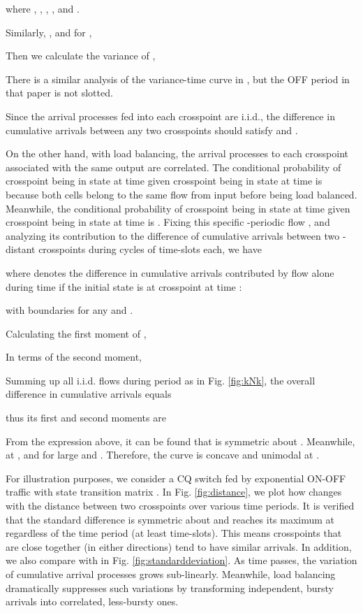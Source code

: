 \documentclass[journal,final,doublecolumn,10pt,twoside]{IEEEtranTCOM} \normalsize
\begin{document}
where , , , , and .

Similarly, , and for ,



Then we calculate the variance of ,
 
There is a similar analysis of the variance-time curve in \cite{variancetime}, but the OFF period in that paper is not slotted.

Since the arrival processes fed into each crosspoint are i.i.d., the difference in cumulative arrivals between any two crosspoints  should satisfy  and .

On the other hand, with load balancing, the arrival processes to each crosspoint associated with the same output are correlated. The conditional probability of crosspoint  being in state  at time  given crosspoint  being in state  at time  is  because both cells belong to the same flow from input  before being load balanced. Meanwhile, the conditional probability of crosspoint  being in state  at time  given crosspoint  being in state  at time  is . Fixing this specific -periodic flow , and analyzing its contribution to the difference of cumulative arrivals between two -distant crosspoints during  cycles of  time-slots each, we have

where  denotes the difference in cumulative arrivals contributed by flow  alone during time  if the initial state is  at crosspoint  at time :


with boundaries  for any  and .

Calculating the first moment of ,




In terms of the second moment,



 

Summing up all  i.i.d. flows during period  as in Fig. \ref{fig:kNk}, the overall difference in cumulative arrivals equals

thus its first and second moments are



From the expression above, it can be found that  is symmetric about . Meanwhile,  at , and  for large  and . Therefore, the curve is concave and unimodal at .

For illustration purposes, we consider a  CQ switch fed by exponential ON-OFF traffic with state transition matrix . In Fig. \ref{fig:distance}, we plot how  changes with the distance between two crosspoints over various time periods. It is verified that the standard difference is symmetric about and reaches its maximum at  regardless of the time period (at least  time-slots). This means crosspoints that are close together (in either directions) tend to have similar arrivals. In addition, we also compare  with  in Fig. \ref{fig:standarddeviation}. As time passes, the variation of cumulative arrival processes grows sub-linearly. Meanwhile, load balancing dramatically suppresses such variations by transforming independent, bursty arrivals into correlated, less-bursty ones.
\end{document}
